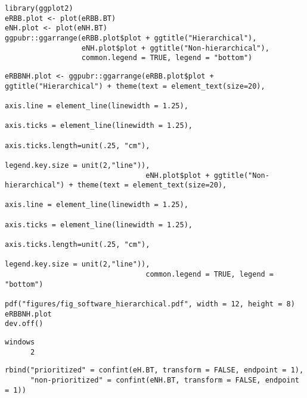 \documentclass[12pt]{article}
\begin{document}
\lstset{language=r,label= ,caption= ,captionpos=b,numbers=none}
\begin{lstlisting}
library(ggplot2)
eRBB.plot <- plot(eRBB.BT)
eNH.plot <- plot(eNH.BT)
ggpubr::ggarrange(eRBB.plot$plot + ggtitle("Hierarchical"),
                  eNH.plot$plot + ggtitle("Non-hierarchical"),
                  common.legend = TRUE, legend = "bottom")
\end{lstlisting}

\lstset{language=r,label= ,caption= ,captionpos=b,numbers=none}
\begin{lstlisting}
eRBBNH.plot <- ggpubr::ggarrange(eRBB.plot$plot + ggtitle("Hierarchical") + theme(text = element_text(size=20), 
                                                                                  axis.line = element_line(linewidth = 1.25),
                                                                                  axis.ticks = element_line(linewidth = 1.25),
                                                                                  axis.ticks.length=unit(.25, "cm"),
                                                                                  legend.key.size = unit(2,"line")),
                                 eNH.plot$plot + ggtitle("Non-hierarchical") + theme(text = element_text(size=20), 
                                                                                     axis.line = element_line(linewidth = 1.25),
                                                                                     axis.ticks = element_line(linewidth = 1.25),
                                                                                     axis.ticks.length=unit(.25, "cm"),
                                                                                     legend.key.size = unit(2,"line")),
                                 common.legend = TRUE, legend = "bottom")

pdf("figures/fig_software_hierarchical.pdf", width = 12, height = 8)
eRBBNH.plot
dev.off()
\end{lstlisting}

\begin{verbatim}
windows 
      2
\end{verbatim}


\lstset{language=r,label= ,caption= ,captionpos=b,numbers=none}
\begin{lstlisting}
rbind("prioritized" = confint(eH.BT, transform = FALSE, endpoint = 1),
      "non-prioritized" = confint(eNH.BT, transform = FALSE, endpoint = 1))

\end{lstlisting}
\end{document}
